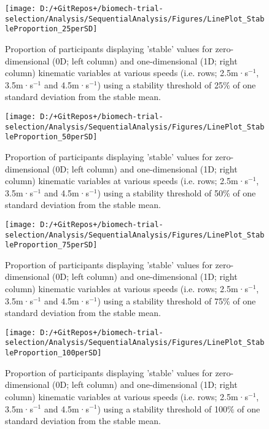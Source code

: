 \documentclass[]{elsarticle} %
\begin{document}
\begin{figure}

{\centering \texttt{[image: D:/+GitRepos+/biomech-trial-selection/Analysis/SequentialAnalysis/Figures/LinePlot\_StableProportion\_25perSD]} 

}

\caption{Proportion of participants displaying 'stable' values for zero-dimensional (0D; left column) and one-dimensional (1D; right column) kinematic variables at various speeds (i.e. rows; 2.5m·s$^{-1}$, 3.5m·s$^{-1}$ and 4.5m·s$^{-1}$) using a stability threshold of 25$\%$ of one standard deviation from the stable mean.}\label{fig:stableParticipants25}
\end{figure}

\begin{figure}

{\centering \texttt{[image: D:/+GitRepos+/biomech-trial-selection/Analysis/SequentialAnalysis/Figures/LinePlot\_StableProportion\_50perSD]} 

}

\caption{Proportion of participants displaying 'stable' values for zero-dimensional (0D; left column) and one-dimensional (1D; right column) kinematic variables at various speeds (i.e. rows; 2.5m·s$^{-1}$, 3.5m·s$^{-1}$ and 4.5m·s$^{-1}$) using a stability threshold of 50$\%$ of one standard deviation from the stable mean.}\label{fig:stableParticipants50}
\end{figure}

\begin{figure}

{\centering \texttt{[image: D:/+GitRepos+/biomech-trial-selection/Analysis/SequentialAnalysis/Figures/LinePlot\_StableProportion\_75perSD]} 

}

\caption{Proportion of participants displaying 'stable' values for zero-dimensional (0D; left column) and one-dimensional (1D; right column) kinematic variables at various speeds (i.e. rows; 2.5m·s$^{-1}$, 3.5m·s$^{-1}$ and 4.5m·s$^{-1}$) using a stability threshold of 75$\%$ of one standard deviation from the stable mean.}\label{fig:stableParticipants75}
\end{figure}

\begin{figure}

{\centering \texttt{[image: D:/+GitRepos+/biomech-trial-selection/Analysis/SequentialAnalysis/Figures/LinePlot\_StableProportion\_100perSD]} 

}

\caption{Proportion of participants displaying 'stable' values for zero-dimensional (0D; left column) and one-dimensional (1D; right column) kinematic variables at various speeds (i.e. rows; 2.5m·s$^{-1}$, 3.5m·s$^{-1}$ and 4.5m·s$^{-1}$) using a stability threshold of 100$\%$ of one standard deviation from the stable mean.}\label{fig:stableParticipants100}
\end{figure}
\end{document}
